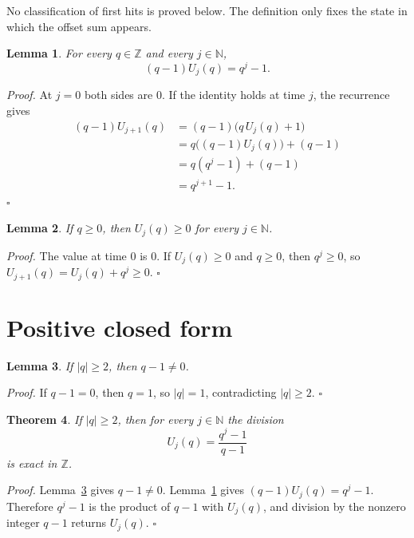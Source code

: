 \documentclass[11pt,letterpaper]{article}
\newcommand{\N}{\mathbb{N}}
\newcommand{\Z}{\mathbb{Z}}
\newtheorem{theorem}{Theorem}
\newtheorem{lemma}[theorem]{Lemma}
\newenvironment{proof}{\noindent\textit{Proof.}}{\hfill\(\square\)}
\begin{document}
No classification of first hits is proved below. The definition only fixes the state in which the offset sum appears.

\begin{lemma}
\label{lem:mul}
For every \(q\in\Z\) and every \(j\in\N\),
\[
(q-1)U_j(q)=q^j-1.
\]
\end{lemma}

\begin{proof}
At \(j=0\) both sides are \(0\). If the identity holds at time \(j\), the recurrence gives
\begin{align*}
(q-1)U_{j+1}(q)
&=(q-1)\bigl(q\,U_j(q)+1\bigr)\\
&=q\bigl((q-1)U_j(q)\bigr)+(q-1)\\
&=q(q^j-1)+(q-1)\\
&=q^{j+1}-1.
\end{align*}
\end{proof}

\begin{lemma}
\label{lem:nonneg}
If \(q\ge 0\), then \(U_j(q)\ge 0\) for every \(j\in\N\).
\end{lemma}

\begin{proof}
The value at time \(0\) is \(0\). If \(U_j(q)\ge 0\) and \(q\ge 0\), then \(q^j\ge 0\), so \(U_{j+1}(q)=U_j(q)+q^j\ge 0\).
\end{proof}

\section{Positive closed form}

\begin{lemma}
\label{lem:denom}
If \(|q|\ge 2\), then \(q-1\neq 0\).
\end{lemma}

\begin{proof}
If \(q-1=0\), then \(q=1\), so \(|q|=1\), contradicting \(|q|\ge 2\).
\end{proof}

\begin{theorem}
\label{thm:exact}
If \(|q|\ge 2\), then for every \(j\in\N\) the division
\[
U_j(q)=\frac{q^j-1}{q-1}
\]
is exact in \(\Z\).
\end{theorem}

\begin{proof}
Lemma~\ref{lem:denom} gives \(q-1\neq 0\). Lemma~\ref{lem:mul} gives \((q-1)U_j(q)=q^j-1\). Therefore \(q^j-1\) is the product of \(q-1\) with \(U_j(q)\), and division by the nonzero integer \(q-1\) returns \(U_j(q)\).
\end{proof}
\end{document}
